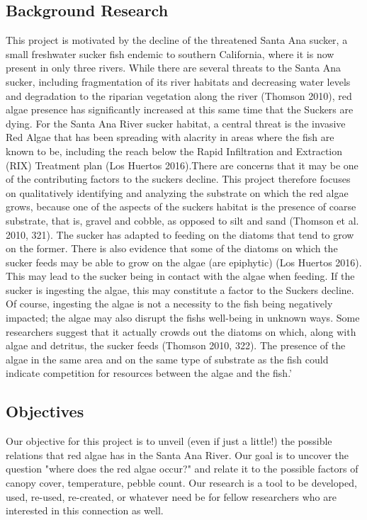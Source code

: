 \documentclass{article}\usepackage[]{graphicx}\usepackage[]{color}
\begin{document}
\subsection{Background Research} 
This project is motivated by the decline of the threatened Santa Ana sucker, a small freshwater sucker ﬁsh endemic to southern California, where it is now present in only three rivers. While there are several threats to the Santa Ana sucker, including fragmentation of its river habitats and decreasing water levels and degradation to the riparian vegetation along the river (Thomson 2010), red algae presence has significantly increased at this same time that the Suckers are dying. For the Santa Ana River sucker habitat, a central threat is the invasive Red Algae that has been spreading with alacrity in areas where the ﬁsh are known to be, including the reach below the Rapid Inﬁltration and Extraction (RIX) Treatment plan (Los Huertos 2016).There are concerns that it may be one of the contributing factors to the suckers decline. This project therefore focuses on qualitatively identifying and analyzing the substrate on which the red algae grows, because one of the aspects of the suckers habitat is the presence of coarse substrate, that is, gravel and cobble, as opposed to silt and sand (Thomson et al. 2010, 321). The sucker has adapted to feeding on the diatoms that tend to grow on the former. There is also evidence that some of the diatoms on which the sucker feeds may be able to grow on the algae (are epiphytic) (Los Huertos 2016). This may lead to the sucker being in contact with the algae when feeding. If the sucker is ingesting the algae, this may constitute a factor to the Suckers decline. Of course, ingesting the algae is not a necessity to the ﬁsh being negatively impacted; the algae may also disrupt the ﬁshs well-being in unknown ways. Some researchers suggest that it actually crowds out the diatoms on which, along with algae and detritus, the sucker feeds (Thomson 2010, 322). The presence of the algae in the same area and on the same type of substrate as the ﬁsh could indicate competition for resources between the algae and the ﬁsh.'

\subsection{Objectives}
Our objective for this project is to unveil (even if just a little!) the possible relations that red algae has in the Santa Ana River. Our goal is to uncover the question "where does the red algae occur?" and relate it to the possible factors of canopy cover, temperature, pebble count. Our research is a tool to be developed, used, re-used, re-created, or whatever need be for fellow researchers who are interested in this connection as well. 
\end{document}
